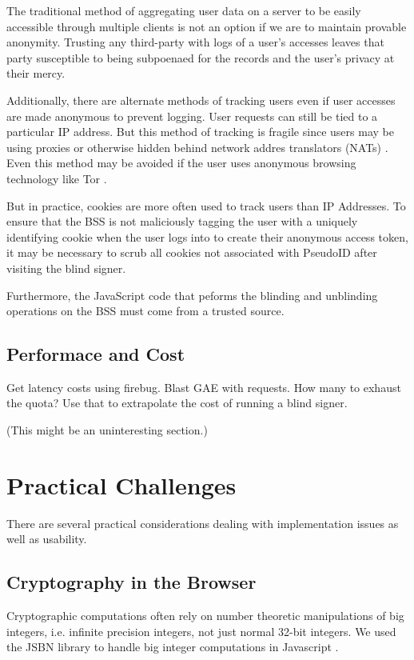 \documentclass{llncs}
\begin{document}
The traditional method of aggregating user data on a server to be easily
accessible through multiple clients is not an option if we are to maintain
provable anonymity. Trusting any third-party with logs of a user's accesses
leaves that party susceptible to being subpoenaed for the records and the user's
privacy at their mercy.

Additionally, there are alternate methods of tracking users even if user
accesses are made anonymous to prevent logging. User requests can still be tied
to a particular IP address. But this method of tracking is fragile since users
may be using proxies or otherwise hidden behind network addres translators
(NATs) \cite{Pool00}. Even this method may be avoided if the user uses anonymous
browsing technology like Tor \cite{Tor}.

But in practice, cookies are more often used to track users than IP Addresses.
To ensure that the BSS is not maliciously tagging the user with a uniquely
identifying cookie when the user logs into to create their anonymous access
token, it may be necessary to scrub all cookies not associated with PseudoID
after visiting the blind signer.

Furthermore, the JavaScript code that peforms the blinding and unblinding
operations on the BSS must come from a trusted source.

\subsection{Performace and Cost}

Get latency costs using firebug. Blast GAE with requests. How many to
exhaust the quota? Use that to extrapolate the cost of running a blind
signer.

(This might be an uninteresting section.)

\section{Practical Challenges}

There are several practical considerations dealing with implementation issues as
well as usability.

\subsection{Cryptography in the Browser}

Cryptographic computations often rely on number theoretic manipulations of big
integers, i.e. infinite precision integers, not just normal 32-bit integers. We
used the JSBN library to handle big integer computations in Javascript
\cite{Jsbn}.
\end{document}
